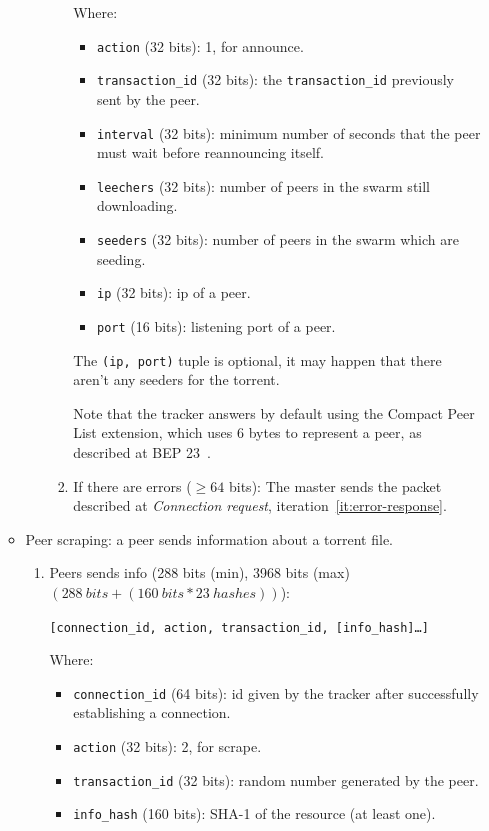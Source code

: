 \documentclass[twoside,a4paper,10pt]{article}
\begin{document}
\begin{itemize}
\begin{itemize}
\begin{enumerate}
\begin{enumerate}
        Where:
        \begin{itemize}
        \item \texttt{action} (32 bits): 1, for announce.
        \item \texttt{transaction\_id} (32 bits): the \texttt{transaction\_id}
          previously sent by the peer.
        \item \texttt{interval} (32 bits): minimum number of seconds that the
          peer must wait before reannouncing itself.
        \item \texttt{leechers} (32 bits): number of peers in the swarm still
          downloading.
        \item \texttt{seeders} (32 bits): number of peers in the swarm which
          are seeding.
        \item \texttt{ip} (32 bits): ip of a peer.
        \item \texttt{port} (16 bits): listening port of a peer.
        \end{itemize}

        The \texttt{(ip, port)} tuple is optional, it may happen that there
        aren't any seeders for the torrent.

        Note that the tracker answers by default using the Compact Peer List
        extension, which uses 6 bytes to represent a peer, as described at BEP
        23~\cite{bep23}.

      \item If there are errors ($\geq64$ bits):
        The master sends the packet described at
        \emph{Connection request}, iteration~\ref{it:error-response}.
      \end{enumerate}
    \end{enumerate}

  \item Peer scraping: a peer sends information about a torrent file.
    \begin{enumerate}
    \item Peers sends info (288 bits (min), 3968 bits (max)
      $(288\ bits + (160\ bits * 23\ hashes))$):

      \texttt{[connection\_id, action, transaction\_id,
          [info\_hash]\ldots]}

      Where:
      \begin{itemize}
      \item \texttt{connection\_id} (64 bits): id given by the tracker after
        successfully establishing a connection.
      \item \texttt{action} (32 bits): 2, for scrape.
      \item \texttt{transaction\_id} (32 bits): random number generated by
        the peer.
      \item \texttt{info\_hash} (160 bits): SHA-1 of the resource (at least
        one). 
      \end{itemize}
      

\end{enumerate}
\end{itemize}
\end{itemize}
\end{document}

